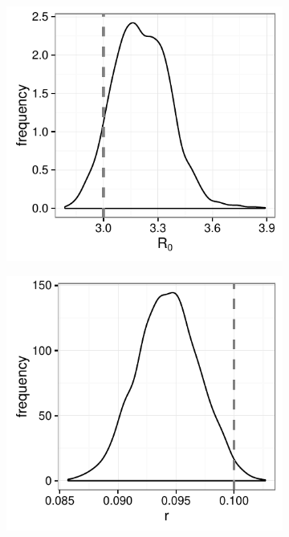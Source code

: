     \begin{figure}
    	\centering
    	\captionsetup{width=0.8\linewidth}
        \begin{subfigure}[tl]{0.4\textwidth}
            \includegraphics[width=\textwidth]{./images/kernelR0.pdf}
        \end{subfigure}
        \begin{subfigure}[tr]{0.4\textwidth}
            \includegraphics[width=\textwidth]{./images/kernelr.pdf}

\end{subfigure}
\end{figure}
